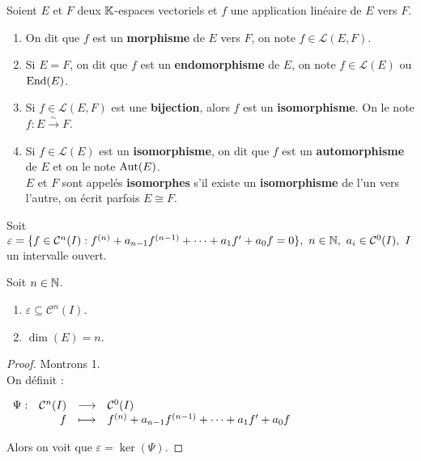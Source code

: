 \begin{definition}
    \par \noindent Soient $E$ et $F$ deux $\mathbb{K}$-espaces vectoriels et $f$ une application linéaire de $E$ vers $F$.
    \begin{enumerate}
        \item On dit que $f$ est un \textbf{morphisme} de $E$ vers $F$, on note $f \in \mathcal{L}(E, F)$.
        \item Si $E = F$, on dit que $f$ est un \textbf{endomorphisme} de $E$, on note $f \in \mathcal{L}(E)$ ou $\operatorname{End}(E)$.
        \item Si $f \in \mathcal{L}(E, F)$ est une \textbf{bijection}, alors $f$ est un \textbf{isomorphisme}. On le note $f : E \overset{\sim}{\to} F$.
        \item Si $f \in \mathcal{L}(E)$ est un \textbf{isomorphisme}, on dit que $f$ est un \textbf{automorphisme} de $E$ et on le note $\operatorname{Aut}(E)$.
        \\
        $E$ et $F$ sont appelés \textbf{isomorphes} s'il existe un \textbf{isomorphisme} de l'un vers l'autre, on écrit parfois $E \cong F$.
    \end{enumerate}
\end{definition}

Soit $\varepsilon = \{ f \in \mathcal{C}^n(I) : f^{(n)} + a_{n - 1} f^{(n - 1)} + \cdots + a_1 f' + a_0 f = 0 \},\ n \in \mathbb{N},\ a_i \in \mathcal{C}^0(I),\ I$ un intervalle ouvert.

\begin{proposition}
    Soit $n \in \mathbb{N}$.
    \begin{multicols}{2}
        \begin{enumerate}
            \item $\varepsilon \subseteq \mathcal{C}^n(I)$.
            \item $\dim(E) = n$.
        \end{enumerate}
    \end{multicols}
\end{proposition}

\begin{proof}
	Montrons 1. \\
	On définit :
	\begin{center}
		$\begin{array}{rrcl} \Psi : & \mathcal{C}^n(I) & \longrightarrow & \mathcal{C}^0(I) \\ & f & \longmapsto & f^{(n)} + a_{n-1}f^{(n-1)} + \cdots + a_1 f' + a_0 f \end{array}$
	\end{center}
	Alors on voit que $\varepsilon = \ker(\Psi)$.
\end{proof}

